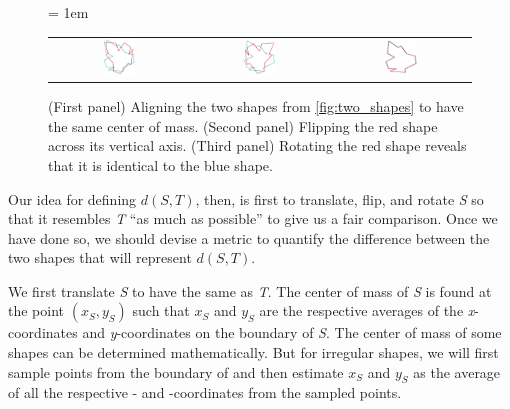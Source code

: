 \begin{figure}[h]
	\centering
	\tabcolsep = 1em
	\mySfFamily
	\begin{tabular}{c c c}
		\includegraphics[width = 0.25\textwidth]{../images_CMYK/shape_transformation2} & 
\includegraphics[width = 0.25\textwidth]{../images_CMYK/shape_transformation3} &  \includegraphics[width = 0.25\textwidth]{../images_CMYK/shape_transformation4}
	\end{tabular}
	\caption{ (First panel) Aligning the two shapes from \autoref{fig:two_shapes} to have the same center of mass. (Second panel) Flipping the red shape across its vertical axis. (Third panel) Rotating the red shape reveals that it is identical to the blue shape.}
	\label{fig:shape_transformation}
\end{figure}

Our idea for defining $d(S, T)$, then, is first to translate, flip, and rotate \textit{S} so that it resembles \textit{T} ``as much as possible'' to give us a fair comparison. Once we have done so, we should devise a metric to quantify the difference between the two shapes that will represent $d(S, T)$.

We first translate \textit{S} to have the same  as \textit{T}. The center of mass of \textit{S} is found at the point $(x_{S}, y_{S})$ such that $x_{S}$ and $y_{S}$ are the respective averages of the \textit{x}-coordinates and \textit{y}-coordinates on the boundary of \textit{S}. The center of mass of some shapes can be determined mathematically. But for irregular shapes, we will first sample  points from the boundary of  and then estimate $x_S$ and $y_S$ as the average of all the respective - and -coordinates from the sampled points.


